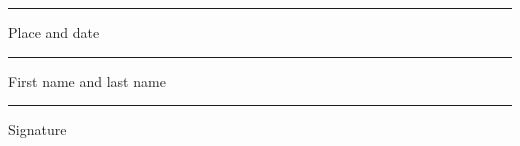 \vspace{2cm}

\noindent
\begin{minipage}[t]{0.45\textwidth}
  \centering\small \placedate \par
  \rule{\linewidth}{0.4pt}\par
  \small Place and date
\end{minipage}\hfill
\begin{minipage}[t]{0.45\textwidth}
  \centering\small \mainauthor \par
  \rule{\linewidth}{0.4pt}\par
  \small First name and last name
\end{minipage}

\vspace{2.5cm}

\noindent
\begin{minipage}[t]{0.45\textwidth}\mbox{}\end{minipage}\hfill
\begin{minipage}[t]{0.45\textwidth}
  \centering \rule{\linewidth}{0.4pt}\par
  \small Signature
\end{minipage}
